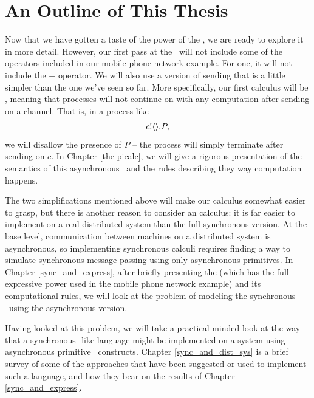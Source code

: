 \section{An Outline of This Thesis}	
	Now that we have gotten a taste of the power of the \picalc, we are ready to explore it in more detail.  
However, our first pass at the \picalc\ will not include some of the operators included in our mobile phone network example.  
For one, it will not include the $+$ operator.  
We will also use a version of sending that is a little simpler than the one we've seen so far.  
More specifically, our first calculus will be , meaning that processes will not continue on with any computation after sending on a channel.  
That is, in a process like
\[
	{c}!\langle{}\rangle.P,
\]
we will disallow the presence of $P$ -- the process will simply terminate after sending on $c$.  
In Chapter \ref{the picalc}, we will give a rigorous presentation of the semantics of this asynchronous \picalc\ and the rules describing they way computation happens.

The two simplifications mentioned above will make our calculus somewhat easier to grasp, but there is another reason to consider an  calculus: it is far easier to implement on a real distributed system than the full synchronous version.  
At the base level, communication between machines on a distributed system is asynchronous, so implementing synchronous calculi requires finding a way to simulate synchronous message passing using only asynchronous primitives.  
In Chapter \ref{sync_and_express}, after briefly presenting the  \picalc (which has the full expressive power used in the mobile phone network example) and its computational rules, we will look at the problem of modeling the synchronous \picalc\ using the asynchronous version.

Having looked at this problem, we will take a practical-minded look at the way that a synchronous \picalc-like language might be implemented on a system using asynchronous primitive \picalc\ constructs. 
Chapter \ref{sync_and_dist_sys} is a brief survey of some of the approaches that have been suggested or used to implement such a language, and how they bear on the results of Chapter \ref{sync_and_express}.